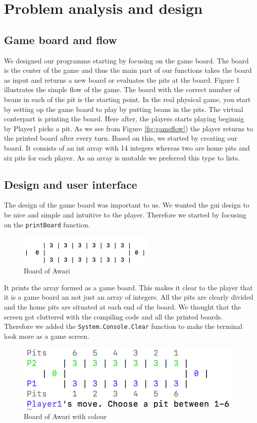\documentclass[a4paper]{report}
\begin{document}
\section*{Problem analysis and design}
\subsection*{Game board and flow}
We designed our programme starting by focusing on the game board. The board is
the center of the game and thus the main part of our functions takes the board 
as input and returns a new board or evaluates the pits at the board. Figure 1 
illustrates the simple flow of the game. The board with the correct number of beans in each of the pit is the starting point. In the real physical game, you start by setting op the game board to play by putting beans in the pits. The virtual conterpart is printing the board. Here after, the players starts playing beginnig by Player1 picks a pit. As we see from Figure
\ref{fig:gameflow}) the player returns to the printed board after every turn. Based on this, we started by creating our board. It consists of an int array with 14 
integers whereas two are home pits and six pits for each player. As an array 
is mutable we preferred this type to lists. 

\subsection*{Design and user interface}
The design of the game board was important to us. We wanted the gui design to be nice and simple and intuitive to the player. Therefore we started by focusing on the 
\texttt{printBoard} function. 

\begin{figure}
\centering
\includegraphics[width=0.60\textwidth]{board1}
\caption{Board of Awari}
\end{figure}
It prints the array formed as a game board. This makes it clear to the player that it is a game board an not just an array of integers. All the pits are clearly divided and the home pits are situated at each end of the board. We thought that the screen got cluttered with the compiling code and all the printed boards. Therefore we added the \texttt{System.Console.Clear} function to make the terminal look more as a game screen.
\newline
\begin{figure}
\centering
\includegraphics{boardcolor}
\caption{Board of Awari with colour}
\end{figure}
 
\end{document}
